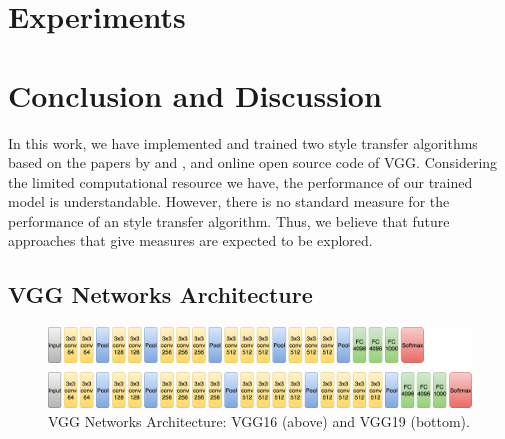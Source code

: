 \documentclass{article} %
\begin{document}
\section{Experiments}
\label{exp}





\section{Conclusion and Discussion}
In this work, we have implemented and trained two style transfer algorithms based on the papers by \cite{1508.06576} and \cite{1603.08155}, and online open source code of VGG. Considering the limited computational resource we have, the performance of our trained model is understandable. However, there is no standard measure for the performance of an style transfer algorithm. Thus, we believe that future approaches that give measures are expected to be explored.



\newpage
\begin{appendix}
\section{VGG Networks Architecture}
\begin{figure}[ht]
\includegraphics[scale=0.3]{VGG.png}
\caption{VGG Networks Architecture: VGG16 (above) and VGG19 (bottom).}
\label{vgg}
\end{figure}

\end{appendix}
\end{document}
